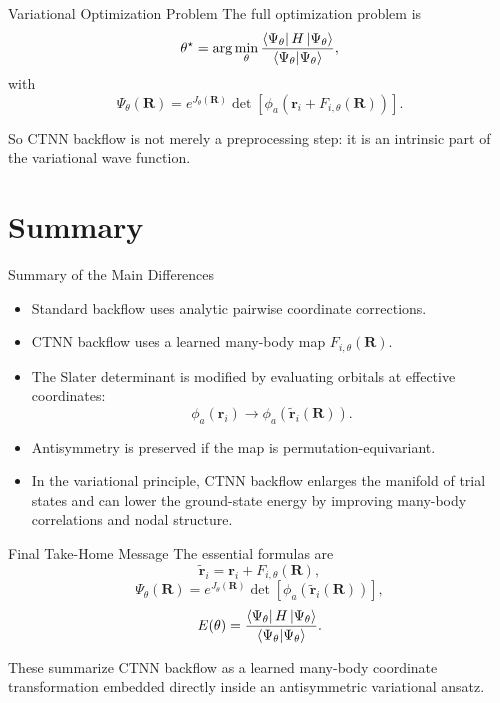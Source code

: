 \documentclass[aspectratio=169]{beamer}
\begin{document}
\begin{frame}{Variational Optimization Problem}
The full optimization problem is
\[
\theta^\star
=
\arg\min_\theta
\frac{\bra{\Psi_\theta}H\ket{\Psi_\theta}}{\braket{\Psi_\theta|\Psi_\theta}},
\]
with
\[
\Psi_\theta(\mathbf{R})
=
e^{J_\theta(\mathbf{R})}
\det[\phi_a(\mathbf{r}_i+F_{i,\theta}(\mathbf{R}))].
\]

So CTNN backflow is not merely a preprocessing step: it is an intrinsic part of the variational wave function.
\end{frame}

\section{Summary}

\begin{frame}{Summary of the Main Differences}
\begin{itemize}
    \item Standard backflow uses analytic pairwise coordinate corrections.
    \item CTNN backflow uses a learned many-body map \(F_{i,\theta}(\mathbf{R})\).
    \item The Slater determinant is modified by evaluating orbitals at effective coordinates:
    \[
    \phi_a(\mathbf{r}_i)\to \phi_a(\tilde{\mathbf{r}}_i(\mathbf{R})).
    \]
    \item Antisymmetry is preserved if the map is permutation-equivariant.
    \item In the variational principle, CTNN backflow enlarges the manifold of trial states and can lower the ground-state energy by improving many-body correlations and nodal structure.
\end{itemize}
\end{frame}

\begin{frame}{Final Take-Home Message}
The essential formulas are
\[
\tilde{\mathbf{r}}_i=\mathbf{r}_i+F_{i,\theta}(\mathbf{R}),
\]
\[
\Psi_\theta(\mathbf{R})
=
e^{J_\theta(\mathbf{R})}
\det[\phi_a(\tilde{\mathbf{r}}_i(\mathbf{R}))],
\]
\[
E(\theta)=\frac{\bra{\Psi_\theta}H\ket{\Psi_\theta}}{\braket{\Psi_\theta|\Psi_\theta}}.
\]

These summarize CTNN backflow as a learned many-body coordinate transformation embedded directly inside an antisymmetric variational ansatz.
\end{frame}
\end{document}
